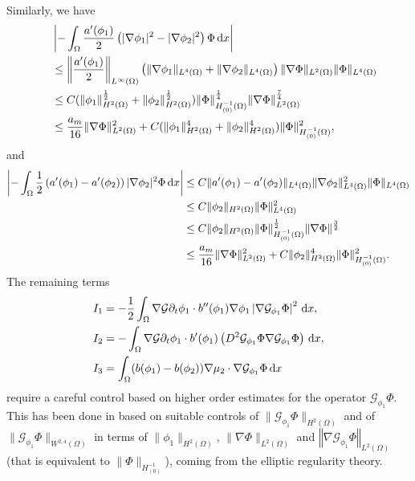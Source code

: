 \documentclass[11pt,reqno]{amsart}
\theoremstyle{remark}
\newcommand \norm[1] {\left\Vert #1\right\Vert}
\def\G{\mathcal{G}}
\def\d{{\rm d}}
\numberwithin{equation}{section}
\def\d{{\rm d}}
\begin{document}
Similarly, we have
\begin{align*}
&\left| -\int_\Omega \frac{a'(\phi_1)}{2}  \left( |\nabla \phi_1|^2-|\nabla \phi_2|^2\right)\Phi
 \, \d x\right|
 \\
\quad &\leq  \left\| \frac{a'(\phi_1)}{2}\right\|_{L^\infty(\Omega)} \left( \| \nabla \phi_1\|_{L^4(\Omega)}+ \| \nabla \phi_2\|_{L^4(\Omega)} \right) \| \nabla \Phi\|_{L^2(\Omega)} \| \Phi\|_{L^4(\Omega)}
\\
\quad &\leq C(\|\phi_1\|_{H^2(\Omega)}^{\frac12}+\|\phi_2\|_{H^2(\Omega)}^{\frac12})\|\Phi\|_{H^{-1}_{(0)}(\Omega)}^{\frac14}\|\nabla \Phi\|^{\frac74}_{L^2(\Omega)}
\\
&\leq \frac{a_m}{16}\|\nabla \Phi\|^{2}_{L^2(\Omega)}+C(\|\phi_1\|_{H^2(\Omega)}^4+\|\phi_2\|_{H^2(\Omega)}^{4})\|\Phi\|_{H^{-1}_{(0)}(\Omega)}^{2},
 \end{align*}
and
 \begin{align*}
\left| - \int_\Omega \frac12  \left( a'(\phi_1)-a'(\phi_2)\right) | \nabla \phi_2|^2 \Phi \, \d x\right|
&\leq C \| a'(\phi_1)-a'(\phi_2)\|_{L^4(\Omega)}
\|\nabla\phi_2\|_{L^4(\Omega)}^2\|\Phi\|_{L^4(\Omega)}
\\
&\leq C\|\phi_2\|_{H^2(\Omega)}
\| \Phi\|_{L^4(\Omega)}^2
\\
&\leq C\|\phi_2\|_{H^2(\Omega)}
\|\Phi\|_{H^{-1}_{(0)}(\Omega)}^{\frac12}
\|\nabla \Phi\|^{\frac32}
\\
&\leq \frac{a_m}{16}\|\nabla \Phi\|^{2}_{L^2(\Omega)}+C\|\phi_2\|_{H^2(\Omega)}^4\|\Phi\|_{H^{-1}_{(0)}(\Omega)}^{2}.
\end{align*}
The remaining terms
\begin{align}
\label{I1}
I_1 &=- \frac12 \int_\Omega \nabla \G \partial_t \phi_1 \cdot b''(\phi_1) \nabla \phi_1 \left| \nabla \G_{\phi_1} \Phi \right|^2 \, \d x,
\\
\label{I2}
I_2 &=-  \int_\Omega \nabla \G \partial_t \phi_1 \cdot  b'(\phi_1) \left( D^2 \G_{\phi_1} \Phi \nabla \G_{\phi_1} \Phi \right) \, \d x,
\\
\label{I3}
I_3 &= \int_\Omega (b(\phi_1)-b(\phi_2)) \nabla \mu_2 \cdot \nabla \G_{\phi_1} \Phi \, \d x
\end{align}
 require a careful control based on higher order estimates for the operator $\mathcal{G}_{\phi_1} \Phi$. This has been done in \cite[Section 3]{CGGG2025}  based on suitable controls of
$\| \mathcal{G}_{\phi_1} \Phi\|_{H^2(\Omega)}$ and of $\| \mathcal{G}_{\phi_1} \Phi\|_{W^{2,4}(\Omega)}$ in terms of $\|\phi_1\|_{H^2(\Omega)}$, $\|\nabla \Phi\|_{L^2(\Omega)}$ and $\norm{\nabla \G_{\phi_1} \Phi}_{L^2(\Omega)}$ (that is equivalent to $\|\Phi\|_{H^{-1}_{(0)}}$), coming from the elliptic regularity theory.
\end{document}
